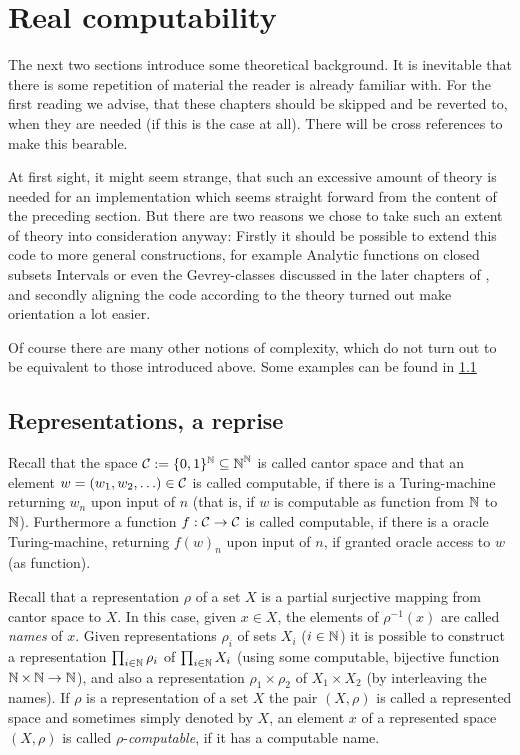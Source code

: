 \section{Real computability}

	The next two sections introduce some theoretical background. It is inevitable that there is some repetition of material the reader is already familiar with. For the first reading we advise, that these chapters should be skipped and be reverted to, when they are needed (if this is the case at all). There will be cross references to make this bearable.

	At first sight, it might seem strange, that such an excessive amount of theory is needed for an implementation which seems straight forward from the content of the preceding section. But there are two reasons we chose to take such an extent of theory into consideration anyway: Firstly it should be possible to extend this code to more general constructions, for example Analytic functions on closed subsets Intervals or even the Gevrey-classes discussed in the later chapters of \cite{gevrey}, and secondly aligning the code according to the theory turned out make orientation a lot easier.

	Of course there are many other notions of complexity, which do not turn out to be equivalent to those introduced above. Some examples can be found in \cref{}

	\subsection{Representations, a reprise}

		Recall that the space $\operatorname{\mathcal{C}} := \{0,1\}^{\operatorname{\mathbb{N}}} \subseteq \operatorname{\mathbb{N}}^{\operatorname{\mathbb{N}}}$ is called cantor space and that an element $w=(w_1, w_2, \ldots) \in \operatorname{\mathcal{C}}$ is called computable, if there is a Turing-machine returning $w_n$ upon input of $n$ (that is, if $w$ is computable as function from $\operatorname{\mathbb{N}}$ to $\operatorname{\mathbb{N}}$). Furthermore a function $f:\operatorname{\mathcal{C}}\to \operatorname{\mathcal{C}}$ is called computable, if there is a oracle Turing-machine, returning $f(w)_n$ upon input of $n$, if granted oracle access to $w$ (as function).

		Recall that a representation $\rho$ of a set $X$ is a partial surjective mapping from cantor space to $X$. In this case, given $x\in X$, the elements of $\rho^{-1}(x)$ are called \emph{names} of $x$. Given representations $\rho_i$ of sets $X_i$ ($i\in \operatorname{\mathbb{N}}$) it is possible to construct a representation $\prod_{i\in \operatorname{\mathbb{N}}} \rho_i$ of $\prod_{i\in \operatorname{\mathbb{N}}} X_i$ (using some computable, bijective function $\operatorname{\mathbb{N}}\times\operatorname{\mathbb{N}}\to\operatorname{\mathbb{N}}$), and also a representation $\rho_1 \times \rho_2$ of $X_1 \times X_2$ (by interleaving the names). If $\rho$ is a representation of a set $X$ the pair $(X,\rho)$ is called a represented space and sometimes simply denoted by $X$, an element $x$ of a represented space $(X,\rho)$ is called $\rho$-\emph{computable}, if it has a computable name.

